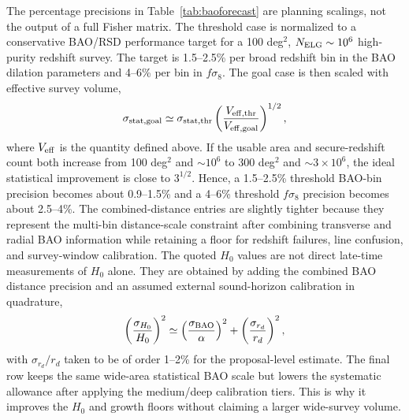 \documentclass[10pt,onecolumn]{article}
\newcommand{\fsig}{f\sigma_8}
\begin{document}
The percentage precisions in Table~\ref{tab:baoforecast} are planning scalings, not the output of a full Fisher matrix. The threshold case is normalized to a conservative BAO/RSD performance target for a 100 deg$^2$, $N_{\rm ELG}\sim10^6$ high-purity redshift survey. The target is 1.5--2.5\% per broad redshift bin in the BAO dilation parameters and 4--6\% per bin in $\fsig$. The goal case is then scaled with effective survey volume,
\begin{equation}
  \sigma_{\rm stat,goal}\simeq
  \sigma_{\rm stat,thr}
  \left(\frac{V_{\rm eff,thr}}{V_{\rm eff,goal}}\right)^{1/2},
\end{equation}
where $V_{\rm eff}$ is the quantity defined above. If the usable area and secure-redshift count both increase from 100 deg$^2$ and $\sim10^6$ to 300 deg$^2$ and $\sim3\times10^6$, the ideal statistical improvement is close to $3^{1/2}$. Hence, a 1.5--2.5\% threshold BAO-bin precision becomes about 0.9--1.5\% and a 4--6\% threshold $\fsig$ precision becomes about 2.5--4\%. The combined-distance entries are slightly tighter because they represent the multi-bin distance-scale constraint after combining transverse and radial BAO information while retaining a floor for redshift failures, line confusion, and survey-window calibration. The quoted $H_0$ values are not direct late-time measurements of $H_0$ alone. They are obtained by adding the combined BAO distance precision and an assumed external sound-horizon calibration in quadrature,
\begin{equation}
  \left(\frac{\sigma_{H_0}}{H_0}\right)^2
  \simeq
  \left(\frac{\sigma_{\rm BAO}}{\alpha}\right)^2+
  \left(\frac{\sigma_{r_d}}{r_d}\right)^2 ,
\end{equation}
with $\sigma_{r_d}/r_d$ taken to be of order 1--2\% for the proposal-level estimate. The final row keeps the same wide-area statistical BAO scale but lowers the systematic allowance after applying the medium/deep calibration tiers. This is why it improves the $H_0$ and growth floors without claiming a larger wide-survey volume.
\end{document}
